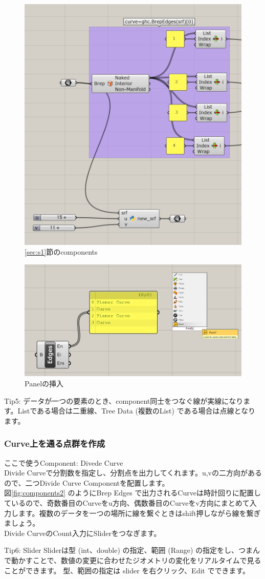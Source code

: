 \documentclass[11pt]{jarticle}
\begin{document}
\begin{figure}[H]
  \centering
    \includegraphics[width=0.7\linewidth]{fig/p1.png}
    \caption{\ref{sec:s1}節のcomponents}
    \label{fig:components1}
\end{figure}

\begin{figure}[H]
  \centering
    \includegraphics[width=0.5\linewidth]{fig/panel.png}
    \caption{Panelの挿入}
\end{figure}
\begin{itembox}[l]{Tip5:}
  データが一つの要素のとき、component同士をつなぐ線が実線になります。Listである場合は二重線、Tree Data (複数のList) である場合は点線となります。
\end{itembox}

\subsubsection{Curve上を通る点群を作成}
\label{sec:s2}
ここで使うComponent: Divede Curve\\
Divide Curveで分割数を指定し、分割点を出力してくれます。u,vの二方向があるので、二つDivide Curve Componentを配置します。\\
図\ref{fig:components2} のようにBrep Edges で出力されるCurveは時計回りに配置しているので、奇数番目のCurveをu方向、偶数番目のCurveをv方向にまとめて入力します。複数のデータを一つの場所に線を繋ぐときはshift押しながら線を繋ぎましょう。\\
Divide CurveのCount入力にSliderをつなぎます。
\begin{itembox}[l]{Tip6: Slider}
Sliderは型 (int、double) の指定、範囲 (Range) の指定をし、つまんで動かすことで、数値の変更に合わせたジオメトリの変化をリアルタイムで見ることができます。
型、範囲の指定は slider を右クリック、Edit でできます。
\end{itembox}
\end{document}
